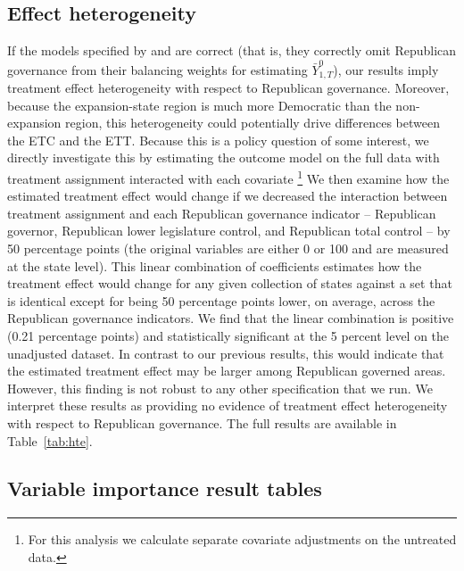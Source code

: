 \subsection{Effect heterogeneity}

If the models specified by \cite{kaestner2017effects} and \cite{courtemanche2017early} are correct (that is, they correctly omit Republican governance from their balancing weights for estimating $\bar{Y}^0_{1, T}$), our results imply treatment effect heterogeneity with respect to Republican governance. Moreover, because the expansion-state region is much more Democratic than the non-expansion region, this heterogeneity could potentially drive differences between the ETC and the ETT. Because this is a policy question of some interest, we directly investigate this by estimating the outcome model on the full data with treatment assignment interacted with each covariate \footnote{For this analysis we calculate separate covariate adjustments on the untreated data.} We then examine how the estimated treatment effect would change if we decreased the interaction between treatment assignment and each Republican governance indicator -- Republican governor, Republican lower legislature control, and Republican total control -- by 50 percentage points (the original variables are either 0 or 100 and are measured at the state level). This linear combination of coefficients estimates how the treatment effect would change for any given collection of states against a set that is identical except for being 50 percentage points lower, on average, across the Republican governance indicators. We find that the linear combination is positive (0.21 percentage points) and statistically significant at the 5 percent level on the unadjusted dataset. In contrast to our previous results, this would indicate that the estimated treatment effect may be larger among Republican governed areas. However, this finding is not robust to any other specification that we run. We interpret these results as providing no evidence of treatment effect heterogeneity with respect to Republican governance. The full results are available in Table~\ref{tab:hte}.

\subsection{Variable importance result tables}


